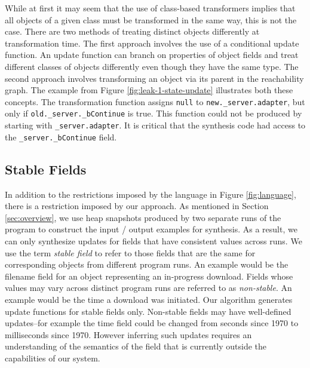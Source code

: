 While at first it may seem that the use of class-based transformers implies that all objects of a given class must be transformed in the same way, this is not the case.  There are two methods of treating distinct objects differently at transformation time.
 The first approach involves the use of a conditional update function.  An update function can branch on properties of object fields and treat different classes of objects differently even though they have the same type.  
The second approach involves transforming an object via its parent in the reachability graph.  
The example from Figure \ref{fig:leak-1-state-update} illustrates both these concepts.  The transformation function assigns \texttt{null} to \texttt{new.\_server.adapter}, but only if \texttt{old.\_server.\_bContinue} is true.  This function could not be produced by starting with \texttt{\_server.adapter}.  It is critical that the synthesis code had access to the \texttt{\_server.\_bContinue} field.


\subsection{Stable Fields}

In addition to the restrictions imposed by the language in Figure \ref{fig:language}, there is a restriction imposed by our approach.  As mentioned in Section \ref{sec:overview}, we use heap snapshots produced by two separate runs of the program to construct the input / output examples for synthesis.  As a result, we can only synthesize updates for fields that have consistent values across runs.  We use the term \emph{stable field} to refer to those fields that are the same for corresponding objects from different program runs.  An example would be the filename field for an object representing an in-progress download.
Fields whose values may vary across distinct program runs are referred to as \emph{non-stable}.  An example would be the time a download was initiated.  Our algorithm generates update functions for stable fields only.  Non-stable fields may have well-defined updates--for example the time field could be changed from seconds since 1970 to milliseconds since 1970.  However inferring such updates requires an understanding of the semantics of the field that is currently outside the capabilities of our system.

